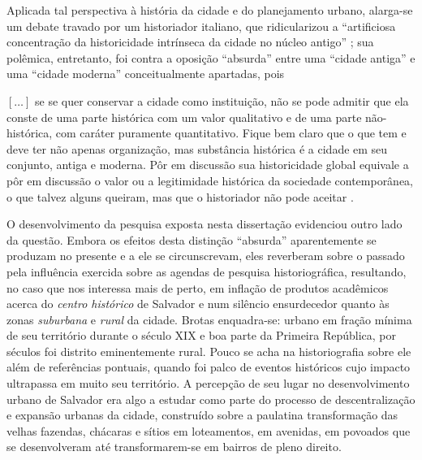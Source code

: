 Aplicada tal perspectiva à história da cidade e do planejamento urbano, alarga-se um debate travado por um historiador italiano, que ridicularizou a ``artificiosa concentração da historicidade intrínseca da cidade no núcleo antigo'' \cite[p.~74]{argan_histcid_1992}; sua polêmica, entretanto, foi contra a oposição ``absurda'' entre uma ``cidade antiga'' e uma ``cidade moderna'' conceitualmente apartadas, pois 

\begin{citacao}
\([\dots]\) se se quer conservar a cidade como instituição, não se pode admitir que ela conste de uma parte histórica com um valor qualitativo e de uma parte não-histórica, com caráter puramente quantitativo. Fique bem claro que o que tem e deve ter não apenas organização, mas substância histórica é a cidade em seu conjunto, antiga e moderna. Pôr em discussão sua historicidade global equivale a pôr em discussão o valor ou a legitimidade histórica da sociedade contemporânea, o que talvez alguns queiram, mas que o historiador não pode aceitar \cite[p.~79]{argan_histcid_1992}.
\end{citacao}

O desenvolvimento da pesquisa exposta nesta dissertação evidenciou outro lado da questão. Embora os efeitos desta distinção ``absurda'' aparentemente se produzam no presente e a ele se circunscrevam, eles reverberam sobre o passado pela influência exercida sobre as agendas de pesquisa historiográfica, resultando, no caso que nos interessa mais de perto, em inflação de produtos acadêmicos acerca do \textit{centro histórico} de Salvador e num silêncio ensurdecedor quanto às zonas \textit{suburbana} e \textit{rural} da cidade. Brotas enquadra-se: urbano em fração mínima de seu território durante o século XIX e boa parte da Primeira República, por séculos foi distrito eminentemente rural. Pouco se acha na historiografia sobre ele além de referências pontuais, quando foi palco de eventos históricos cujo impacto ultrapassa em muito seu território. A percepção de seu lugar no desenvolvimento urbano de Salvador era algo a estudar como parte do processo de descentralização e expansão urbanas da cidade, construído sobre a paulatina transformação das velhas fazendas, chácaras e sítios em loteamentos, em avenidas, em povoados que se desenvolveram até transformarem-se em bairros de pleno direito.

